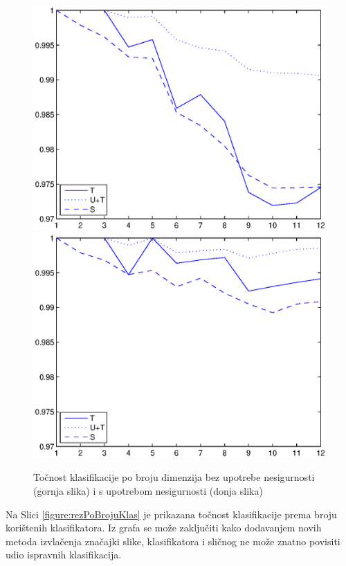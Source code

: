 \documentclass[a4paper,twocolumn,dvipdfm]{article}
\begin{document}
\begin{figure}
\centering
\includegraphics[scale=0.5]{accByDim1.eps}
\includegraphics[scale=0.5]{accByDim2.eps}
\caption{Točnost klasifikacije po broju dimenzija bez upotrebe nesigurnosti
(gornja slika) i s upotrebom nesigurnosti (donja slika)}
\label{figure:rezPoDim}
\end{figure}

Na Slici \ref{figure:rezPoBrojuKlas} je prikazana točnost klasifikacije prema
broju korištenih klasifikatora. Iz grafa se može zaključiti kako dodavanjem
novih metoda izvlačenja značajki slike, klasifikatora i sličnog ne može znatno
povisiti udio ispravnih klasifikacija.
\end{document}
